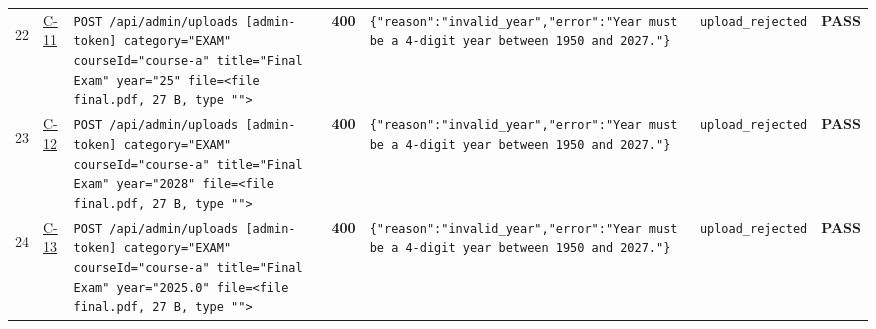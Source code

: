 \documentclass[10pt,a4paper]{article}
\begin{document}
\begin{landscape}
\begin{longtable}{@{}P{0.6cm}P{0.9cm}P{8.5cm}P{1.0cm}P{6.2cm}P{4.2cm}P{1.1cm}@{}}
\hypertarget{call22}{22} & \hyperlink{test-C-11}{C-11} & \texttt{POST /\allowbreak{}api/\allowbreak{}admin/\allowbreak{}uploads [admin-\allowbreak{}token] category=\allowbreak{}"\allowbreak{}EXAM"\allowbreak{} courseId=\allowbreak{}"\allowbreak{}course-\allowbreak{}a"\allowbreak{} title=\allowbreak{}"\allowbreak{}Final Exam"\allowbreak{} year=\allowbreak{}"\allowbreak{}25"\allowbreak{} file=\allowbreak{}<file final.\allowbreak{}pdf,\allowbreak{} 27 B,\allowbreak{} type "\allowbreak{}"\allowbreak{}>} & \textcolor{warnamber}{\textbf{400}} & \texttt{\{"\allowbreak{}reason"\allowbreak{}:\allowbreak{}"\allowbreak{}invalid\_\allowbreak{}year"\allowbreak{},\allowbreak{}"\allowbreak{}error"\allowbreak{}:\allowbreak{}"\allowbreak{}Year must be a 4-\allowbreak{}digit year between 1950 and 2027.\allowbreak{}"\allowbreak{}\}} & \texttt{upload\_\allowbreak{}rejected} & \textcolor{passgreen}{\textbf{PASS}} \\
\hypertarget{call23}{23} & \hyperlink{test-C-12}{C-12} & \texttt{POST /\allowbreak{}api/\allowbreak{}admin/\allowbreak{}uploads [admin-\allowbreak{}token] category=\allowbreak{}"\allowbreak{}EXAM"\allowbreak{} courseId=\allowbreak{}"\allowbreak{}course-\allowbreak{}a"\allowbreak{} title=\allowbreak{}"\allowbreak{}Final Exam"\allowbreak{} year=\allowbreak{}"\allowbreak{}2028"\allowbreak{} file=\allowbreak{}<file final.\allowbreak{}pdf,\allowbreak{} 27 B,\allowbreak{} type "\allowbreak{}"\allowbreak{}>} & \textcolor{warnamber}{\textbf{400}} & \texttt{\{"\allowbreak{}reason"\allowbreak{}:\allowbreak{}"\allowbreak{}invalid\_\allowbreak{}year"\allowbreak{},\allowbreak{}"\allowbreak{}error"\allowbreak{}:\allowbreak{}"\allowbreak{}Year must be a 4-\allowbreak{}digit year between 1950 and 2027.\allowbreak{}"\allowbreak{}\}} & \texttt{upload\_\allowbreak{}rejected} & \textcolor{passgreen}{\textbf{PASS}} \\
\hypertarget{call24}{24} & \hyperlink{test-C-13}{C-13} & \texttt{POST /\allowbreak{}api/\allowbreak{}admin/\allowbreak{}uploads [admin-\allowbreak{}token] category=\allowbreak{}"\allowbreak{}EXAM"\allowbreak{} courseId=\allowbreak{}"\allowbreak{}course-\allowbreak{}a"\allowbreak{} title=\allowbreak{}"\allowbreak{}Final Exam"\allowbreak{} year=\allowbreak{}"\allowbreak{}2025.\allowbreak{}0"\allowbreak{} file=\allowbreak{}<file final.\allowbreak{}pdf,\allowbreak{} 27 B,\allowbreak{} type "\allowbreak{}"\allowbreak{}>} & \textcolor{warnamber}{\textbf{400}} & \texttt{\{"\allowbreak{}reason"\allowbreak{}:\allowbreak{}"\allowbreak{}invalid\_\allowbreak{}year"\allowbreak{},\allowbreak{}"\allowbreak{}error"\allowbreak{}:\allowbreak{}"\allowbreak{}Year must be a 4-\allowbreak{}digit year between 1950 and 2027.\allowbreak{}"\allowbreak{}\}} & \texttt{upload\_\allowbreak{}rejected} & \textcolor{passgreen}{\textbf{PASS}} \\

\end{longtable}
\end{landscape}
\end{document}
